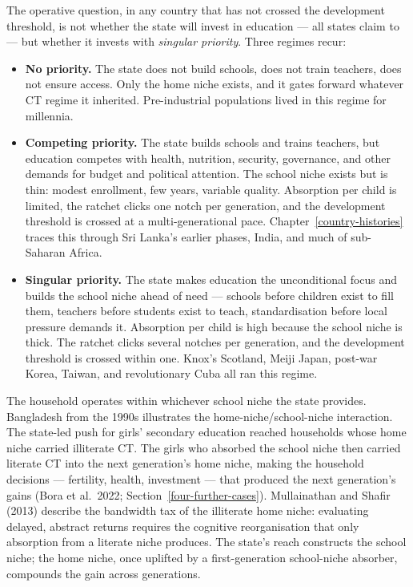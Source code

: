 \documentclass[12pt,letterpaper]{article}
\begin{document}
The operative question, in any country that has not crossed the
development threshold, is not whether the state will invest in
education --- all states claim to --- but whether it invests with
\emph{singular priority}. Three regimes recur:

\begin{itemize}
\item \textbf{No priority.} The state does not build schools, does
not train teachers, does not ensure access. Only the home niche
exists, and it gates forward whatever CT regime it inherited.
Pre-industrial populations lived in this regime for millennia.

\item \textbf{Competing priority.} The state builds schools and
trains teachers, but education competes with health, nutrition,
security, governance, and other demands for budget and political
attention. The school niche exists but is thin: modest enrollment,
few years, variable quality. Absorption per child is limited, the
ratchet clicks one notch per generation, and the development
threshold is crossed at a multi-generational pace.
Chapter~\ref{country-histories} traces this through Sri Lanka's earlier
phases, India, and much of sub-Saharan Africa.

\item \textbf{Singular priority.} The state makes education the
unconditional focus and builds the school niche ahead of need ---
schools before children exist to fill them, teachers before
students exist to teach, standardisation before local pressure
demands it. Absorption per child is high because the school niche
is thick. The ratchet clicks several notches per generation, and
the development threshold is crossed within one. Knox's Scotland,
Meiji Japan, post-war Korea, Taiwan, and revolutionary Cuba all ran
this regime.
\end{itemize}

The household operates within whichever school niche the state
provides. Bangladesh from the 1990s illustrates the
home-niche/school-niche interaction. The state-led push for girls'
secondary education reached households whose home niche carried
illiterate CT. The girls who absorbed the school niche then
carried literate CT into the next generation's home niche, making
the household decisions --- fertility, health, investment --- that
produced the next generation's gains (Bora et al.~2022;
Section~\ref{four-further-cases}). Mullainathan and Shafir (2013) describe
the bandwidth tax of the illiterate home niche: evaluating delayed,
abstract returns requires the cognitive reorganisation that only
absorption from a literate niche produces. The state's reach
constructs the school niche; the home niche, once uplifted by a
first-generation school-niche absorber, compounds the gain across
generations.
\end{document}
